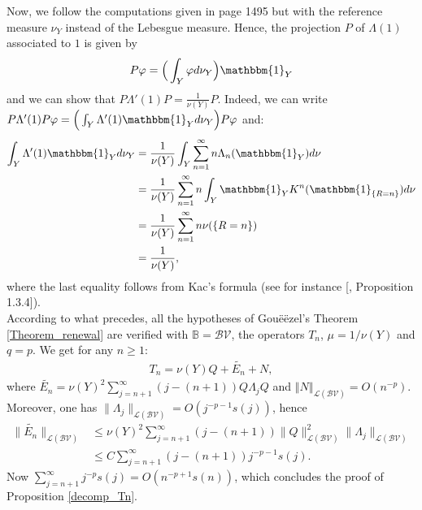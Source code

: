 \documentclass{ws-sd}
\newcommand{\indic}{\mathbbm{1}}
\newcommand{\norm}[1]{\left\Vert #1\right\Vert}
\renewcommand{\Tilde}{\widetilde}
\begin{document}
{Now, we follow the computations given in \cite{15} page 1495 but with the reference measure $\nu_Y$ instead of the Lebesgue measure. Hence, the projection $P$ of $\Lambda(1)$ associated to $1$ is given by
 \begin{align*}
     P\varphi = \Big (\int_Y \varphi  d\nu_Y \Big)\indic_Y
 \end{align*}
and we can show that $P\Lambda'(1)P =  \frac{1}{\nu(Y)}P$. Indeed, we can write $P\Lambda'(1)P\varphi = \Big(\int_Y \Lambda'(1) \indic_Y d\nu_Y\Big)P\varphi$ and:
 \begin{align*}
     \int_Y \Lambda'(1)\indic_{Y} d\nu_Y
     &=\frac{1}{\nu(Y)}\int_Y \sum_{n=1}^{\infty} n \Lambda_n(\indic_Y) d\nu \\
     &=  \frac{1}{\nu(Y)}\sum_{n=1}^{\infty}n \int_Y\indic_Y K^n(\indic_{\{ R = n\}}) d\nu \\
     &= \frac{1}{\nu(Y)}\sum_{n=1}^{\infty}n \nu(\{R=n \})
     \\ &= \frac{1}{\nu(Y)},
 \end{align*}
 where the last equality follows from Kac's formula (see for instance [, Proposition 1.3.4]).
}
\\

According to what precedes, all the hypotheses of Gou\"eëzel's Theorem \ref{Theorem_renewal} are verified with $\mathbb B = \mathcal{BV}$, the operators $T_n$, $\mu = 1/\nu(Y)$ and $q = p$. We get for any $n \ge 1$:
 \begin{align*}
     T_n = \nu(Y)Q + \Tilde{E_n} + N,
 \end{align*}
 where $\Tilde{E_n} = {\nu(Y)^2}\sum_{j = n+1}^\infty (j-(n+1)) Q\Lambda_jQ $ and $\norm{N}_{\mathcal L(\mathcal{BV})} = O(n^{-p})$.
 Moreover, one has $\lVert \Lambda_j \rVert_{\mathcal L(\mathcal{BV})} = O(j^{-p-1}s(j))$, hence
 \begin{align*}
     \lVert \Tilde{E_n} \rVert_{\mathcal L(\mathcal{BV})}
     &\le {\nu(Y)^2}\sum_{j = n+1}^\infty (j-(n+1)) \lVert Q\rVert_{\mathcal L(\mathcal{BV})}^2 \lVert \Lambda_j \rVert_{\mathcal L(\mathcal{BV})}
     \\&
     \le C\sum_{j = n+1}^\infty (j-(n+1)) j^{-p-1}s(j).
 \end{align*}
Now $\sum_{j = n+1}^\infty j^{-p}s(j) = O(n^{-p+1}s(n))$, which concludes the proof of Proposition \ref{decomp_Tn}.
\end{document}
